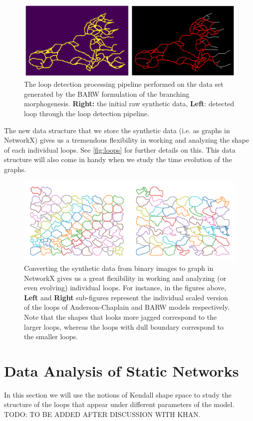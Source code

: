 \documentclass[10pt,a4paper,twocolumn]{article}
\begin{document}
	\begin{figure}[h!]
		\centering
		\includegraphics[width=1\linewidth]{images/BARWProc}
		\caption{The loop detection processing pipeline performed on the data set generated by the BARW formulation of the branching morphogenesis. \textbf{Right:} the initial raw synthetic data, \textbf{Left}: detected loop through the loop detection pipeline.}
		\label{fig:barwproc}
	\end{figure}
	
	The new data structure that we store the synthetic data (i.e. as graphs in NetworkX) gives us a tremendous flexibility in working and analyzing the shape of each individual loops. See \autoref{fig:loops} for further details on this. This data structure will also come in handy when we study the time evolution of the graphs.
	\begin{figure}[h!]
		\centering
		\includegraphics[width=1\linewidth]{images/loops.png}
		\caption{Converting the synthetic data from binary images to graph in NetworkX gives us a great flexibility in working and analyzing (or even evolving) individual loops. For instance, in the figures above, \textbf{Left} and \textbf{Right} sub-figures represent the individual scaled version of the loops of Anderson-Chaplain and BARW models respectively. Note that the shapes that looks more jagged correspond to the larger loops, whereas the loops with dull boundary correspond to the smaller loops.}
		\label{fig:loops}
	\end{figure}
	\section{Data Analysis of Static Networks}
	In this section we will use the notions of Kendall shape space to study the structure of the loops that appear under different parameters of the model. {\color{red} \noindent TODO: TO BE ADDED AFTER DISCUSSION WITH KHAN.}
	
\end{document}
